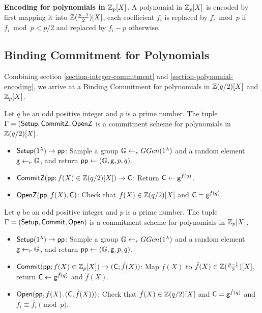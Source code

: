 \textbf{Encoding for polynomials in $\mathbb{Z}_p[X]$.} A polynomial in $\mathbb{Z}_p[X]$ is encoded by first mapping it into $\mathbb{Z}(\frac{p-1}{2})[X]$, each coefficient $f_i$ is replaced by $f_i \bmod p$ if $f_i \bmod p < p/2$ and replaced by $f_i - p$ otherwise.

\subsection{Binding Commitment for Polynomials}

Combining section \ref{section-integer-commitment} and \ref{section-polynomial-encoding}, we arrive at a Binding Commitment for polynomials in $\mathbb{Z}(q/2)[X]$ and $\mathbb{Z}_p[X]$.

\begin{definition}
\label{dark-commitz}
Let $q$ be an odd positive integer and $p$ is a prime number.
The tuple $\Gamma = (\mathsf{Setup}, \mathsf{CommitZ}, \mathsf{OpenZ}$ is a commitment scheme for polynomials in $\mathbb{Z}(q/2)[X]$.
\begin{itemize}
    \item $\mathsf{Setup}(1^\lambda) \to \mathsf{pp}$: Sample a group $\mathbb{G} \gets_r GGen(1^\lambda)$ and a random element $\mathsf{g} \gets_r \mathbb{G}$, and return $\mathsf{pp} \gets (\mathbb{G}, \mathsf{g}, p, q)$.
    \item $\mathsf{CommitZ}(\mathsf{pp}; f(X) \in \mathbb{Z}(q/2)[X]) \to \mathsf{C}$: Return $\mathsf{C} \gets \mathsf{g}^{f(q)}$.
    \item $\mathsf{OpenZ}(\mathsf{pp}, f(X), \mathsf{C})$: Check that $f(X) \in \mathbb{Z}(q/2)[X]$ and $\mathsf{C} = \mathsf{g}^{f(q)}$.
\end{itemize}
\end{definition}

\begin{definition}
\label{dark-commitz}
Let $q$ be an odd positive integer and $p$ is a prime number.
The tuple $\Gamma = (\mathsf{Setup}, \mathsf{Commit}, \mathsf{Open})$ is a commitment scheme for polynomials in $\mathbb{Z}_p[X]$.
\begin{itemize}
    \item $\mathsf{Setup}(1^\lambda) \to \mathsf{pp}$: Sample a group $\mathbb{G} \gets_r GGen(1^\lambda)$ and a random element $\mathsf{g} \gets_r \mathbb{G}$, and return $\mathsf{pp} \gets (\mathbb{G}, \mathsf{g}, p, q)$.
    \item $\mathsf{Commit}(\mathsf{pp}; f(X) \in \mathbb{Z}_p[X]) \to (\mathsf{C}; \hat{f}(X))$: Map $f(X)$ to $\hat{f}(X) \in \mathbb{Z}(\frac{p-1}{2})[X]$, return $\mathsf{C} \gets \mathsf{g}^{\hat{f}(q)}$ and $\hat{f}(X)$.
    \item $\mathsf{Open}(\mathsf{pp}, f(X), (\mathsf{C}, \hat{f}(X)))$: Check that $\hat{f}(X) \in \mathbb{Z}(q/2)[X]$ and $\mathsf{C} = \mathsf{g}^{\hat{f}(q)}$ and $f_i \equiv \hat{f}_i \pmod p$.
\end{itemize}
\end{definition}

